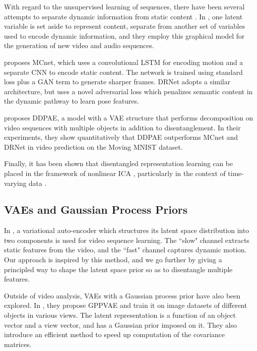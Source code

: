 \documentclass[runningheads]{llncs}
\begin{document}
   With regard to the unsupervised learning of sequences, there have been several attempts to separate dynamic information from static content \cite{Denton2017UnsupervisedLO,Grathwohl2016DisentanglingSA,Hsieh2018LearningTD,Li2018DisentangledSA,Villegas2017DecomposingMA}. In \cite{Li2018DisentangledSA}, one latent variable is set aside to represent content, separate from another set of variables used to encode dynamic information, and they employ this graphical model for the generation of new video and audio sequences.

   \cite{Villegas2017DecomposingMA} proposes MCnet, which uses a convolutional LSTM for encoding motion and a separate CNN to encode static content. The network is trained using standard  loss plus a GAN term to generate sharper frames. DRNet \cite{Denton2017UnsupervisedLO} adopts a similar architecture, but uses a novel adversarial loss which penalizes semantic content in the dynamic pathway to learn pose features. \par 
   
   \cite{Hsieh2018LearningTD} proposes DDPAE, a model with a VAE structure that performs decomposition on video sequences with multiple objects in addition to disentanglement. In their experiments, they show quantitatively that DDPAE outperforms MCnet and DRNet in video prediction on the Moving MNIST dataset. \par 
   
   Finally, it has been shown that disentangled representation learning can be placed in the framework of nonlinear ICA \cite{Kingma2020}, particularly in the context of time-varying data \cite{Hyvarinen2016}.
   
   \subsection{VAEs and Gaussian Process Priors} 
   In \cite{Grathwohl2016DisentanglingSA}, a variational auto-encoder which structures its latent space distribution into two components is used for video sequence learning. The ``slow" channel extracts static features from the video, and the ``fast" channel captures dynamic motion. Our approach is inspired by this method, and we go further by giving a principled way to shape the latent space prior so as to disentangle multiple features. \par 
   
   Outside of video analysis, VAEs with a Gaussian process prior have also been explored. In \cite{Casale2018GaussianPP}, they propose GPPVAE and train it on image datasets of different objects in various views. The latent representation is a function of an object vector and a view vector, and has a Gaussian prior imposed on it. They also introduce an efficient method to speed up computation of the covariance matrices. \par 
   
\end{document}
